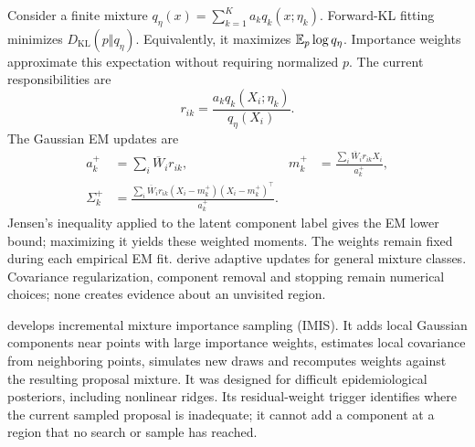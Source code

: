 Consider a finite mixture $q_\eta(x)=\sum_{k=1}^K a_kq_k(x;\eta_k)$.
Forward-KL fitting minimizes $D_{\mathrm{KL}}(p\Vert q_\eta)$.
Equivalently, it maximizes $\mathbb{E}_p\log q_\eta$. Importance weights approximate this expectation without
requiring normalized $p$. The current responsibilities are
\begin{equation}
 r_{ik}=\frac{a_kq_k(X_i;\eta_k)}{q_\eta(X_i)}.
 \label{eq:bf-is-responsibilities}
\end{equation}
The Gaussian EM updates are
\begin{align}
 a_k^{+}&=\sum_i\overline W_i r_{ik},&
 m_k^{+}&=\frac{\sum_i\overline W_i r_{ik}X_i}{a_k^{+}},\\
 \Sigma_k^{+}&=\frac{\sum_i\overline W_i r_{ik}
 (X_i-m_k^{+})(X_i-m_k^{+})^\top}{a_k^{+}}.
 \label{eq:bf-is-weighted-em}
\end{align}
Jensen's inequality applied to the latent component label gives the EM lower
bound; maximizing it yields these weighted moments. The weights remain fixed
during each empirical EM fit. \citet[Section 2]{cappe2008mixtures} derive
adaptive updates for general mixture classes. Covariance regularization,
component removal and stopping remain numerical choices; none creates evidence
about an unvisited region.

\citet[Section 3]{raftery2010imis} develops incremental mixture importance
sampling (IMIS). It adds local Gaussian components near points with large
importance weights, estimates local covariance from neighboring points,
simulates new draws and recomputes weights against the resulting proposal
mixture. It was designed for difficult epidemiological posteriors, including
nonlinear ridges. Its residual-weight trigger identifies where the current
sampled proposal is inadequate; it cannot add a component at a region that no
search or sample has reached.

